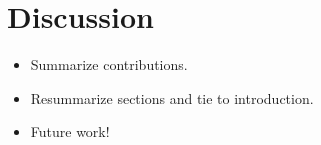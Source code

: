 \section{Discussion}
\begin{itemize}
    \item Summarize contributions. 
    \item Resummarize sections and tie to introduction. 
    \item Future work! 
\end{itemize}